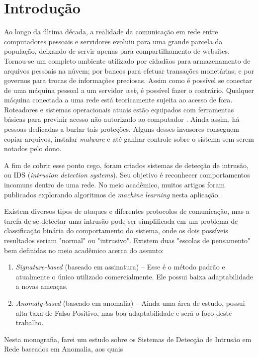 \chapter{Introdução}
\label{ch:introducao}

Ao longo da última década, a realidade da comunicação em rede entre computadores pessoais e servidores evoluiu
para uma grande parcela da população, deixando de servir apenas para compartilhamento de websites.
Tornou-se um completo ambiente utilizado por cidadãos para armazenamento de arquivos pessoais na núvem;
por bancos para efetuar transações monetárias; e por governos para trocas de informações preciosas.
Assim como é possível se conectar de uma máquina pessoal a um servidor \textit{web}, é possível fazer o contrário.
Qualquer máquina conectada a uma rede está teoricamente sujeita ao acesso de fora.
Roteadores e sistemas operacionais atuais estão equipados com ferramentas básicas para previnir acesso não autorizado
ao computador \cite{hongjuan10}. Ainda assim, há pessoas dedicadas a burlar tais proteções. Alguns desses invasores conseguem copiar
arquivos, instalar \textit{malware} e até ganhar controle sobre o sistema sem serem notados pelo dono.
\par A fim de cobrir esse ponto cego, foram criados sistemas de detecção de intrusão, ou IDS
(\textit{intrusion detection systems}). Seu objetivo é reconhecer comportamentos incomuns dentro de uma rede.
No meio acadêmico, muitos artigos foram publicados explorando algoritmos de \emph{machine learning} nesta aplicação.
\par Existem diversos tipos de ataques e diferentes protocolos de comunicação, mas a tarefa de se detectar uma
intrusão pode ser simplificada em um problema de classificação binária do comportamento do sistema, onde os dois
possíveis resultados seriam "normal" ou "intrusivo". Existem duas "escolas de pensamento" bem definidas no meio
acadêmico acerca do assunto:
\begin{enumerate}
    \item \textit{Signature-based} (baseado em assinatura) -- Esse é o método padrão e atualmente o único utilizado
    comercialmente. Ele possui baixa adaptabilidade a novas ameaças.
    \item \textit{Anomaly-based} (baseado em anomalia) -- Ainda uma área de estudo, possui alta taxa de
    Falso Positivo, mas boa adaptabilidade e será o foco deste trabalho.
\end{enumerate}
\par Nesta monografia, farei um estudo sobre os Sistemas de Detecção de Intrusão em Rede baseados em Anomalia, aos quais
